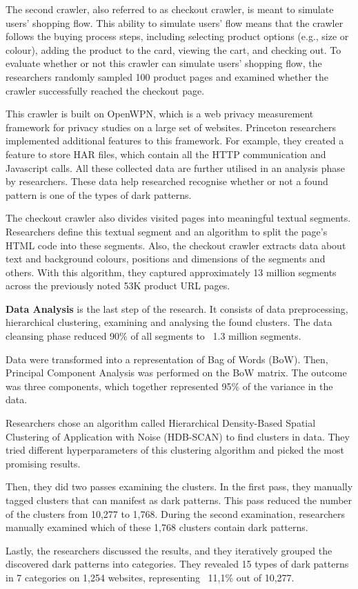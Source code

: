 The second crawler, also referred to as checkout crawler, is meant to simulate users' shopping flow.  This ability to simulate users' flow means that the crawler follows the buying process steps, including selecting product options (e.g., size or colour), adding the product to the card, viewing the cart, and checking out. To evaluate whether or not this crawler can simulate users' shopping flow, the researchers randomly sampled 100 product pages and examined whether the crawler successfully reached the checkout page.

This crawler is built on OpenWPN, which is a web privacy measurement framework for privacy studies on a large set of websites. Princeton researchers implemented additional features to this framework. For example, they created a feature to store HAR files, which contain all the HTTP communication and Javascript calls. All these collected data are further utilised in an analysis phase by researchers. These data help researched recognise whether or not a found pattern is one of the types of dark patterns.

The checkout crawler also divides visited pages into meaningful textual segments. Researchers define this textual segment and an algorithm to split the page's HTML code into these segments\cite{dark-patterns-at-scale}. Also, the checkout crawler extracts data about text and background colours, positions and dimensions of the segments and others. With this algorithm, they captured approximately 13 million segments across the previously noted 53K product URL pages.

\textbf{Data Analysis} is the last step of the research. It consists of data preprocessing, hierarchical clustering, examining and analysing the found clusters. The data cleansing phase reduced 90\% of all segments to ~1.3 million segments.

Data were transformed into a representation of Bag of Words (BoW)\cite{bag-of-words}. Then, Principal Component Analysis was performed on the BoW matrix. The outcome was three components, which together represented 95\% of the variance in the data. 

Researchers chose an algorithm called Hierarchical Density-Based Spatial Clustering of Application with Noise (HDB-SCAN)\cite{hdbscan} to find clusters in data. They tried different hyperparameters of this clustering algorithm and picked the most promising results.

Then, they did two passes examining the clusters. In the first pass, they manually tagged clusters that can manifest as dark patterns. This pass reduced the number of the clusters from 10,277 to 1,768.  During the second examination, researchers manually examined which of these 1,768 clusters contain dark patterns\cite{dark-patterns-at-scale}.

Lastly, the researchers discussed the results, and they iteratively grouped the discovered dark patterns into categories. They revealed 15 types of dark patterns in 7 categories on 1,254 websites, representing ~11,1\% out of 10,277\cite{dark-patterns-at-scale}.




